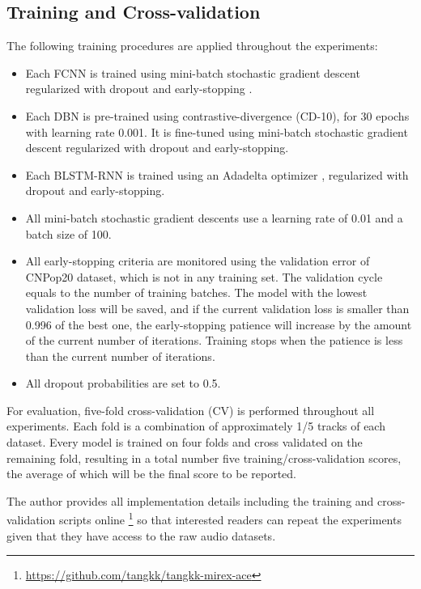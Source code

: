 \subsection{Training and Cross-validation}\label{sec:traintest}

The following training procedures are applied throughout the experiments: 
\begin{itemize}
	\item Each FCNN is trained using mini-batch stochastic gradient descent regularized with dropout \cite{srivastava2014dropout} and early-stopping \cite{prechelt1998automatic}. 
	\item Each DBN is pre-trained using contrastive-divergence \cite{hinton2006fast} (CD-10), for 30 epochs with learning rate 0.001. It is fine-tuned using mini-batch stochastic gradient descent regularized with dropout and early-stopping.
	\item Each BLSTM-RNN is trained using an Adadelta optimizer \cite{zeiler2012adadelta}, regularized with dropout and early-stopping. 
	\item All mini-batch stochastic gradient descents use a learning rate of 0.01 and a batch size of 100. 
	\item All early-stopping criteria are monitored using the validation error of CNPop20 dataset, which is not in any training set. The validation cycle equals to the number of training batches. The model with the lowest validation loss will be saved, and if the current validation loss is smaller than 0.996 of the best one, the early-stopping patience will increase by the amount of the current number of iterations. Training stops when the patience is less than the current number of iterations.
	\item All dropout probabilities are set to 0.5. 
\end{itemize}
For evaluation, five-fold cross-validation (CV) is performed throughout all experiments. Each fold is a combination of approximately 1/5 tracks of each dataset. Every model is trained on four folds and cross validated on the remaining fold, resulting in a total number five training/cross-validation scores, the average of which will be the final score to be reported.

The author provides all implementation details including the training and cross-validation scripts online \footnote{\url{https://github.com/tangkk/tangkk-mirex-ace}} so that interested readers can repeat the experiments given that they have access to the raw audio datasets.

